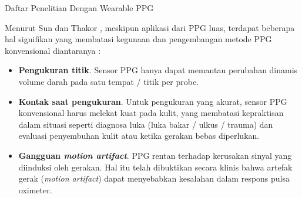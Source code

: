 \begin{table}[ht]
	\vspace{0.8em}
	\caption{Daftar Penelitian Dengan Wearable PPG}
	\centering
	\label{table:wearable_PPG}
\caption*{Sumber: Sun, Y. and Thakor, N. (2016). Photoplethysmography revisited: from contact to noncontact, from point to imaging. IEEE Transactions on Biomedical Engineering, halaman 4.}
\end{table}

Menurut Sun dan Thakor \citep{sun2016}, meskipun aplikasi dari PPG luas, terdapat beberapa hal signifikan yang membatasi kegunaan dan pengembangan metode PPG konvensional diantaranya :

\begin{itemize}
 \item \textbf{Pengukuran titik}. Sensor PPG hanya dapat memantau perubahan dinamis volume darah pada satu tempat / titik per probe.
 \item \textbf{Kontak saat pengukuran}. Untuk pengukuran yang akurat, sensor PPG konvensional harus melekat kuat pada kulit, yang membatasi kepraktisan dalam situasi seperti diagnosa luka (luka bakar / ulkus / trauma) dan evaluasi penyembuhan kulit atau ketika gerakan bebas diperlukan.
 \item \textbf{Gangguan \textit{motion artifact}}. PPG rentan terhadap kerusakan sinyal yang diinduksi oleh gerakan. Hal itu telah dibuktikan secara klinis bahwa artefak gerak (\textit{motion artifact}) dapat menyebabkan kesalahan dalam respons pulsa oximeter.
 \end{itemize}


